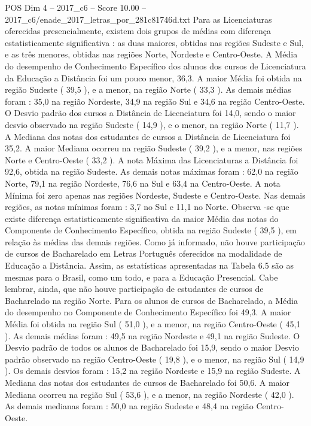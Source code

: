 \begin{textsample}{POS Dim 4 – 2017\_c6 – Score 10.00 – 2017\_c6/enade\_2017\_letras\_por\_281c81746d.txt}
Para as Licenciaturas oferecidas presencialmente, existem dois grupos de médias com diferença estatisticamente significativa : as duas maiores, obtidas nas regiões Sudeste e Sul, e as três menores, obtidas nas regiões Norte, Nordeste e Centro-Oeste.
A Média do desempenho de Conhecimento Específico dos alunos dos cursos de Licenciatura da Educação a Distância foi um pouco menor, 36,3.
A maior Média foi obtida na região Sudeste ( 39,5 ), e a menor, na região Norte ( 33,3 ).
As demais médias foram : 35,0 na região Nordeste, 34,9 na região Sul e 34,6 na região Centro-Oeste.
O Desvio padrão dos cursos a Distância de Licenciatura foi 14,0, sendo o maior desvio observado na região Sudeste ( 14,9 ), e o menor, na região Norte ( 11,7 ).
A Mediana das notas dos estudantes de cursos a Distância de Licenciatura foi 35,2.
A maior Mediana ocorreu na região Sudeste ( 39,2 ), e a menor, nas regiões Norte e Centro-Oeste ( 33,2 ).
A nota Máxima das Licenciaturas a Distância foi 92,6, obtida na região Sudeste.
As demais notas máximas foram : 62,0 na região Norte, 79,1 na região Nordeste, 76,6 na Sul e 63,4 na Centro-Oeste.
A nota Mínima foi zero apenas nas regiões Nordeste, Sudeste e Centro-Oeste.
Nas demais regiões, as notas mínimas foram : 3,7 no Sul e 11,1 no Norte.
Observa -se que existe diferença estatisticamente significativa da maior Média das notas do Componente de Conhecimento Específico, obtida na região Sudeste ( 39,5 ), em relação às médias das demais regiões.
Como já informado, não houve participação de cursos de Bacharelado em Letras Português oferecidos na modalidade de Educação a Distância.
Assim, as estatísticas apresentadas na Tabela 6.5 são as mesmas para o Brasil, como um todo, e para a Educação Presencial.
Cabe lembrar, ainda, que não houve participação de estudantes de cursos de Bacharelado na região Norte.
Para os alunos de cursos de Bacharelado, a Média do desempenho no Componente de Conhecimento Específico foi 49,3.
A maior Média foi obtida na região Sul ( 51,0 ), e a menor, na região Centro-Oeste ( 45,1 ).
As demais médias foram : 49,5 na região Nordeste e 49,1 na região Sudeste.
O Desvio padrão de todos os alunos de Bacharelado foi 15,9, sendo o maior Desvio padrão observado na região Centro-Oeste ( 19,8 ), e o menor, na região Sul ( 14,9 ).
Os demais desvios foram : 15,2 na região Nordeste e 15,9 na região Sudeste.
A Mediana das notas dos estudantes de cursos de Bacharelado foi 50,6.
A maior Mediana ocorreu na região Sul ( 53,6 ), e a menor, na região Nordeste ( 42,0 ).
As demais medianas foram : 50,0 na região Sudeste e 48,4 na região Centro-Oeste.

\end{textsample}

